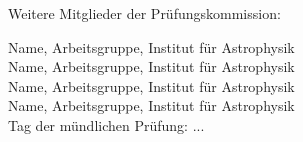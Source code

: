 \noindent Weitere Mitglieder der Prüfungskommission:
\vspace{\baselineskip}

\noindent Name, Arbeitsgruppe, Institut für Astrophysik
\vspace{\baselineskip}\\
Name, Arbeitsgruppe, Institut für Astrophysik
\vspace{\baselineskip}\\
Name, Arbeitsgruppe, Institut für Astrophysik
\vspace{\baselineskip}\\
Name, Arbeitsgruppe, Institut für Astrophysik
\vspace{3\baselineskip}\\

\noindent Tag der mündlichen Prüfung: ...\\


\rmfamily

\cleardoublepage

